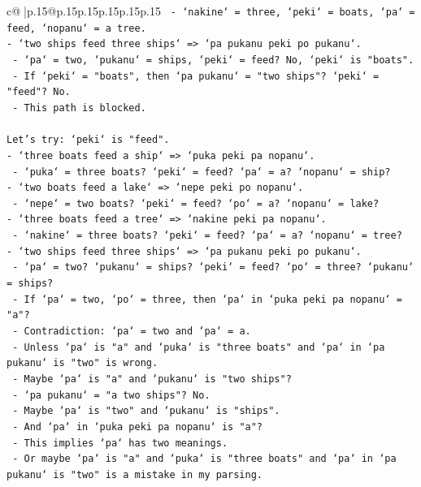 \documentclass{article}
\begin{document}
{\begin{supertabular}{c@{$\;$}|p{.15\linewidth}@{}p{.15\linewidth}p{.15\linewidth}p{.15\linewidth}p{.15\linewidth}p{.15\linewidth}}
{{{\texttt{  {-} `nakine` = three, `peki` = boats, `pa` = feed, `nopanu` = a tree.} \\
\texttt{{-} `two ships feed three ships` => `pa pukanu peki po pukanu`.} \\
\texttt{  {-} `pa` = two, `pukanu` = ships, `peki` = feed? No, `peki` is "boats".} \\
\texttt{  {-} If `peki` = "boats", then `pa pukanu` = "two ships"? `peki` = "feed"? No.} \\
\texttt{  {-} This path is blocked.} \\
\\ 
\texttt{Let's try: `peki` is "feed".} \\
\texttt{{-} `three boats feed a ship` => `puka peki pa nopanu`.} \\
\texttt{  {-} `puka` = three boats? `peki` = feed? `pa` = a? `nopanu` = ship?} \\
\texttt{{-} `two boats feed a lake` => `nepe peki po nopanu`.} \\
\texttt{  {-} `nepe` = two boats? `peki` = feed? `po` = a? `nopanu` = lake?} \\
\texttt{{-} `three boats feed a tree` => `nakine peki pa nopanu`.} \\
\texttt{  {-} `nakine` = three boats? `peki` = feed? `pa` = a? `nopanu` = tree?} \\
\texttt{{-} `two ships feed three ships` => `pa pukanu peki po pukanu`.} \\
\texttt{  {-} `pa` = two? `pukanu` = ships? `peki` = feed? `po` = three? `pukanu` = ships?} \\
\texttt{  {-} If `pa` = two, `po` = three, then `pa` in `puka peki pa nopanu` = "a"?} \\
\texttt{  {-} Contradiction: `pa` = two and `pa` = a.} \\
\texttt{  {-} Unless `pa` is "a" and `puka` is "three boats" and `pa` in `pa pukanu` is "two" is wrong.} \\
\texttt{  {-} Maybe `pa` is "a" and `pukanu` is "two ships"?} \\
\texttt{  {-} `pa pukanu` = "a two ships"? No.} \\
\texttt{  {-} Maybe `pa` is "two" and `pukanu` is "ships".} \\
\texttt{  {-} And `pa` in `puka peki pa nopanu` is "a"?} \\
\texttt{  {-} This implies `pa` has two meanings.} \\
\texttt{  {-} Or maybe `pa` is "a" and `puka` is "three boats" and `pa` in `pa pukanu` is "two" is a mistake in my parsing.} \\
}}}
\end{supertabular}}
\end{document}
